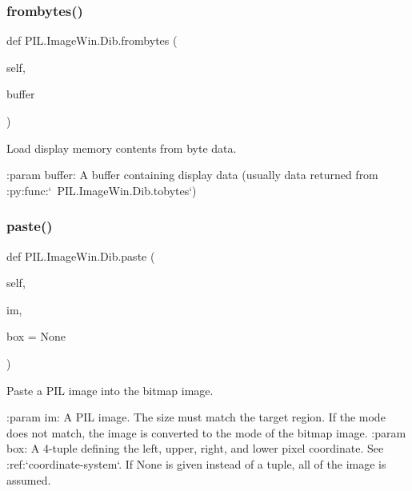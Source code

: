 \subsubsection{\texorpdfstring{frombytes()}{frombytes()}}
{\footnotesize\ttfamily def P\+I\+L.\+Image\+Win.\+Dib.\+frombytes (\begin{DoxyParamCaption}\item[{}]{self,  }\item[{}]{buffer }\end{DoxyParamCaption})}

\begin{DoxyVerb}Load display memory contents from byte data.

:param buffer: A buffer containing display data (usually
       data returned from :py:func:`~PIL.ImageWin.Dib.tobytes`)
\end{DoxyVerb}
 \mbox{\label{classPIL_1_1ImageWin_1_1Dib_a77c4aa03c50825a6adf71b14be19fe20}} 
\subsubsection{\texorpdfstring{paste()}{paste()}}
{\footnotesize\ttfamily def P\+I\+L.\+Image\+Win.\+Dib.\+paste (\begin{DoxyParamCaption}\item[{}]{self,  }\item[{}]{im,  }\item[{}]{box = {\ttfamily None} }\end{DoxyParamCaption})}

\begin{DoxyVerb}Paste a PIL image into the bitmap image.

:param im: A PIL image.  The size must match the target region.
   If the mode does not match, the image is converted to the
   mode of the bitmap image.
:param box: A 4-tuple defining the left, upper, right, and
    lower pixel coordinate.  See :ref:`coordinate-system`. If
    None is given instead of a tuple, all of the image is
    assumed.
\end{DoxyVerb}
 \mbox{\label{classPIL_1_1ImageWin_1_1Dib_a77483e00d82492dae10e37eb2fed913b}} 
